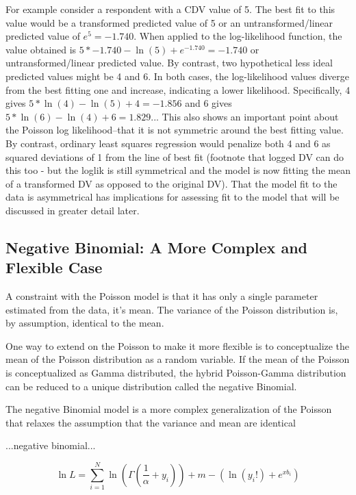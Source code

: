 \documentclass[ShortAfour,times,sageapa]{sagej}
\begin{document}
	For example consider a respondent with a CDV value of 5.  
	The best fit to this value would be a transformed predicted value of 5 or an untransformed/linear predicted value of $e^{5} = -1.740$.  
	When applied to the log-likelihood function, the value obtained is $5*-1.740 - \ln (5) + e^{-1.740} = -1.740$ or untransformed/linear predicted value.
	By contrast, two hypothetical less ideal predicted values might be 4 and 6.  
	In both cases, the log-likelihood values diverge from the best fitting one and increase, indicating a lower likelihood.
	Specifically, 4 gives $5*\ln (4) - \ln (5) + 4 = -1.856$ and 6 gives $5*\ln (6) - \ln (4) + 6 = 1.829$...
	This also shows an important point about the Poisson log likelihood--that it is not symmetric around the best fitting value.  
	By contrast, ordinary least squares regression would penalize both 4 and 6 as squared deviations of 1 from the line of best fit (footnote that logged DV can do this too - but the loglik is still symmetrical and the model is now fitting the mean of a transformed DV as opposed to the original DV).
	That the model fit to the data is asymmetrical has implications for assessing fit to the model that will be discussed in greater detail later.
	
	\subsection{Negative Binomial: A More Complex and Flexible Case}
	
	A constraint with the Poisson model is that it has only a single parameter estimated from the data, it's mean.  The variance of the Poisson distribution is, by assumption, identical to the mean.
	
	One way to extend on the Poisson to make it more flexible is to conceptualize the mean of the Poisson distribution as a random variable.  If the mean of the Poisson is conceptualized as Gamma distributed, the hybrid Poisson-Gamma distribution can be reduced to a unique distribution called the negative Binomial.
	
	The negative Binomial model is a more complex generalization of the Poisson that relaxes the assumption that the variance and mean are identical
	
	...negative binomial...
	
	\begin{equation}
		\ln L = \sum_{i=1}^{N} \ln (\Gamma (\frac{1}{\alpha} + y_{i}) ) + m- (\ln (y_{i}!) + e^{xb_{i}})
	\end{equation}
\end{document}
